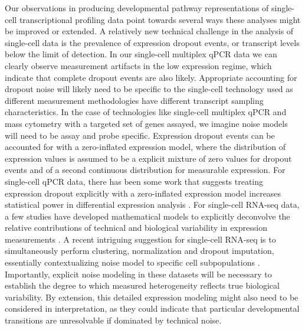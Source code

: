 Our observations in producing developmental pathway representations of single-cell transcriptional profiling data point towards several ways these analyses might be improved or extended. A relatively new technical challenge in the analysis of single-cell data is the prevalence of expression dropout events, or transcript levels below the limit of detection. In our single-cell multiplex qPCR data we can clearly observe measurement artifacts in the low expression regime, which indicate that complete dropout events are also likely. Appropriate accounting for dropout noise will likely need to be specific to the single-cell technology used as different measurement methodologies have different transcript sampling characteristics. In the case of technologies like single-cell multiplex qPCR and mass cytometry with a targeted set of genes assayed, we imagine noise models will need to be assay and probe specific. Expression dropout events can be accounted for with a zero-inflated expression model, where the distribution of expression values is assumed to be a explicit mixture of zero values for dropout events and of a second continuous distribution for measurable expression. For single-cell qPCR data, there has been some work that suggests treating expression dropout explicitly with a zero-inflated expression model increases statistical power in differential expression analysis \cite{mcdavid2012,kharchenko2014}. For single-cell RNA-seq data, a few studies have developed mathematical models to explicitly deconvolve the relative contributions of technical and biological variability in expression measurements \cite{brennecke2013,grun2014}. A recent intriguing suggestion for single-cell RNA-seq is to simultaneously perform clustering, normalization and dropout imputation, essentially contextualizing noise model to specific cell subpopulations \cite{azizi2017}. Importantly, explicit noise modeling in these datasets will be necessary to establish the degree to which measured heterogeneity reflects true biological variability. By extension, this detailed expression modeling might also need to be considered in interpretation, as they could indicate that particular developmental transitions are unresolvable if dominated by technical noise.

